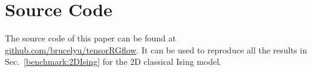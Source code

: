\documentclass[aps,prr,reprint,superscriptaddress,nofootinbib,floatfix]{revtex4-2}
\begin{document}
\section{Source Code\label{append:sc}}
The source code of this paper can be found at \href{https://github.com/brucelyu/tensorRGflow}{github.com/brucelyu/tensorRGflow}.
It can be used to reproduce all the results in Sec.~\ref{benchmark:2DIsing} for the 2D classical Ising model.


\end{document}
